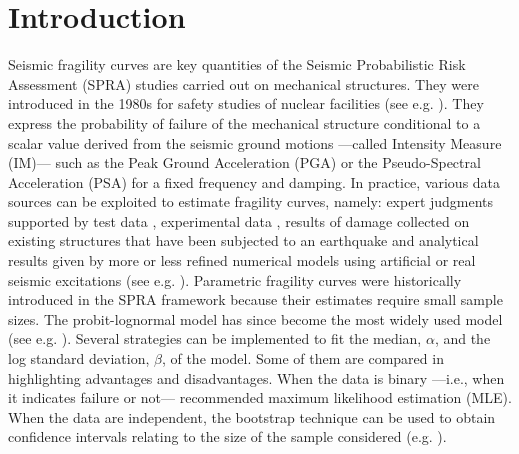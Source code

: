\minitoc





\section{Introduction}


Seismic fragility curves are key quantities of the Seismic Probabilistic Risk Assessment (SPRA) studies carried out on mechanical structures. They were introduced in the 1980s for safety studies of nuclear facilities (see e.g.
\cite{kennedy_probabilistic_1980,kennedy_seismic_1984,park_survey_1998,kennedy_risk_1999,cornell_hazard_2004}).
They express the probability of failure of the mechanical structure conditional to a scalar value derived from the seismic ground motions ---called Intensity Measure (IM)--- such as the Peak Ground Acceleration (PGA) or the Pseudo-Spectral Acceleration (PSA) for a fixed frequency and damping. In practice, various data sources can be exploited to estimate fragility curves, namely: expert judgments supported by test data \citep{kennedy_probabilistic_1980,kennedy_seismic_1984,park_survey_1998,zentner_fragility_2017}, experimental data \citep{park_survey_1998,gardoni_probabilistic_2002,choe_closed-form_2007}, results of damage collected on existing structures that have been subjected to an earthquake \citep{shinozuka_statistical_2000,lallemant_statistical_2015,straub_improved_2008}  and analytical results given by more or less refined numerical models using artificial or real seismic excitations (see e.g. \cite{zentner_numerical_2010,wang_influence_2020,mandal_seismic_2016,wang_seismic_2018,wang_bayesian_2018,zhao_seismic_2020}). Parametric fragility curves were historically introduced in the SPRA framework because their estimates require small sample sizes. The probit-lognormal model has since become the most widely used model (see e.g. \cite{shinozuka_statistical_2000,lallemant_statistical_2015,straub_improved_2008,zentner_numerical_2010,wang_influence_2020,mandal_seismic_2016,wang_bayesian_2018,wang_seismic_2018,zhao_seismic_2020,ellingwood_earthquake_2001,kim_development_2004,mai_seismic_2017,trevlopoulos_parametric_2019,katayama_bayesian-estimation-based_2021}).
Several strategies can be implemented to fit the median, $\alpha$, and the log standard deviation, $\beta$, of the model. Some of them are compared in \cite{lallemant_statistical_2015} highlighting advantages and disadvantages.
When the data is binary ---i.e., when it indicates failure or not--- \citet{lallemant_statistical_2015} recommended maximum likelihood estimation (MLE). When the data are independent, the bootstrap technique can be used to obtain confidence intervals relating to the size of the sample considered (e.g. \cite{shinozuka_statistical_2000,zentner_numerical_2010,wang_influence_2020}). 

